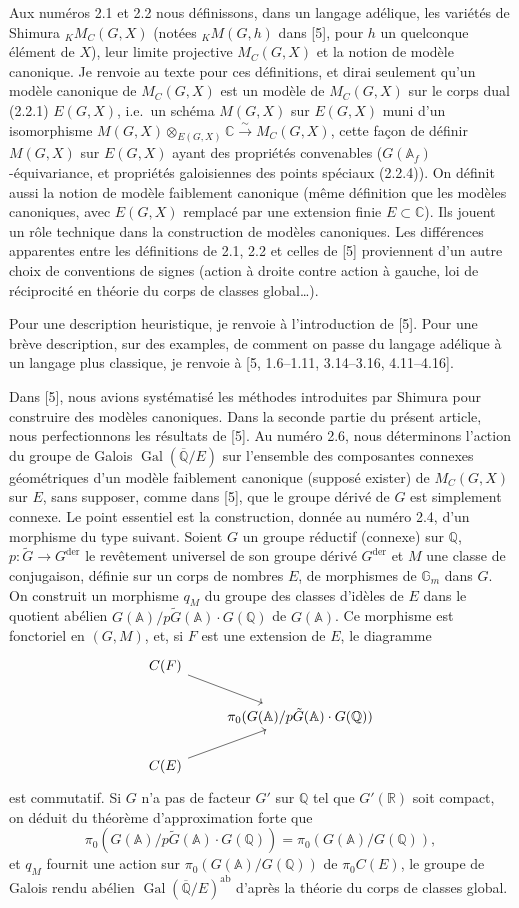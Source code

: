 \documentclass[12pt,a4paper]{article}
\theoremstyle{plain}
\theoremstyle{definition}
\theoremstyle{remark}
\DeclareMathOperator{\Gal}{Gal}
\newcommand{\QQ}{\mathbb{Q}}
\newcommand{\RR}{\mathbb{R}}
\newcommand{\CC}{\mathbb{C}}
\newcommand{\Af}{\mathbb{A}_f}
\newcommand{\A}{\mathbb{A}}
\newcommand{\Gm}{\mathbb{G}}
\newcommand{\simto}{\xrightarrow{\sim}}
\begin{document}
Aux num\'eros 2.1 et 2.2 nous d\'efinissons, dans un langage ad\'elique, les vari\'et\'es de Shimura ${}_K M_C(G,X)$ (not\'ees ${}_K M(G,h)$ dans [5], pour $h$ un quelconque \'el\'ement de $X$), leur limite projective $M_C(G,X)$ et la notion de mod\`ele canonique. Je renvoie au texte pour ces d\'efinitions, et dirai seulement qu'un mod\`ele canonique de $M_C(G,X)$ est un mod\`ele de $M_C(G,X)$ sur le corps dual (2.2.1) $E(G,X)$, i.e.~un sch\'ema $M(G,X)$ sur $E(G,X)$ muni d'un isomorphisme $M(G,X) \otimes_{E(G,X)} \CC \simto M_C(G,X)$, cette fa\c{c}on de d\'efinir $M(G,X)$ sur $E(G,X)$ ayant des propri\'et\'es convenables ($G(\Af)$-\'equivariance, et propri\'et\'es galoisiennes des points sp\'eciaux (2.2.4)). On d\'efinit aussi la notion de mod\`ele faiblement canonique (m\^eme d\'efinition que les mod\`eles canoniques, avec $E(G,X)$ remplac\'e par une extension finie $E \subset \CC$). Ils jouent un r\^ole technique dans la construction de mod\`eles canoniques. Les diff\'erences apparentes entre les d\'efinitions de 2.1, 2.2 et celles de [5] proviennent d'un autre choix de conventions de signes (action \`a droite contre action \`a gauche, loi de r\'eciprocit\'e en th\'eorie du corps de classes global\dots).

Pour une description heuristique, je renvoie \`a l'introduction de [5]. Pour une br\`eve description, sur des examples, de comment on passe du langage ad\'elique \`a un langage plus classique, je renvoie \`a [5, 1.6--1.11, 3.14--3.16, 4.11--4.16].

Dans [5], nous avions syst\'ematis\'e les m\'ethodes introduites par Shimura pour construire des mod\`eles canoniques. Dans la seconde partie du pr\'esent article, nous perfectionnons les r\'esultats de [5]. Au num\'ero 2.6, nous d\'eterminons l'action du groupe de Galois $\Gal(\overline{\QQ}/E)$ sur l'ensemble des composantes connexes g\'eom\'etriques d'un mod\`ele faiblement canonique (suppos\'e exister) de $M_C(G,X)$ sur $E$, sans supposer, comme dans [5], que le groupe d\'eriv\'e de $G$ est simplement connexe. Le point essentiel est la construction, donn\'ee au num\'ero 2.4, d'un morphisme du type suivant. Soient $G$ un groupe r\'eductif (connexe) sur $\QQ$, $p:\tilde{G} \to G^{\text{der}}$ le rev\^etement universel de son groupe d\'eriv\'e $G^{\text{der}}$ et $M$ une classe de conjugaison, d\'efinie sur un corps de nombres $E$, de morphismes de $\Gm_m$ dans $G$. On construit un morphisme $q_M$ du groupe des classes d'id\`eles de $E$ dans le quotient ab\'elien $G(\A)/p\tilde{G}(\A)\cdot G(\QQ)$ de $G(\A)$. Ce morphisme est fonctoriel en $(G,M)$, et, si $F$ est une extension de $E$, le diagramme
\[
\begin{tikzcd}
C(F) \arrow[dr] \\
& \pi_0(G(\A)/p\tilde{G}(\A)\cdot G(\QQ)) \\
C(E) \arrow[ur]
\end{tikzcd}
\]
est commutatif. Si $G$ n'a pas de facteur $G'$ sur $\QQ$ tel que $G'(\RR)$ soit compact, on d\'eduit du th\'eor\`eme d'approximation forte que
\[
\pi_0(G(\A)/p\tilde{G}(\A)\cdot G(\QQ)) = \pi_0(G(\A)/G(\QQ)),
\]
et $q_M$ fournit une action sur $\pi_0(G(\A)/G(\QQ))$ de $\pi_0 C(E)$, le groupe de Galois rendu ab\'elien $\Gal(\overline{\QQ}/E)^{\text{ab}}$ d'apr\`es la th\'eorie du corps de classes global.
\end{document}
